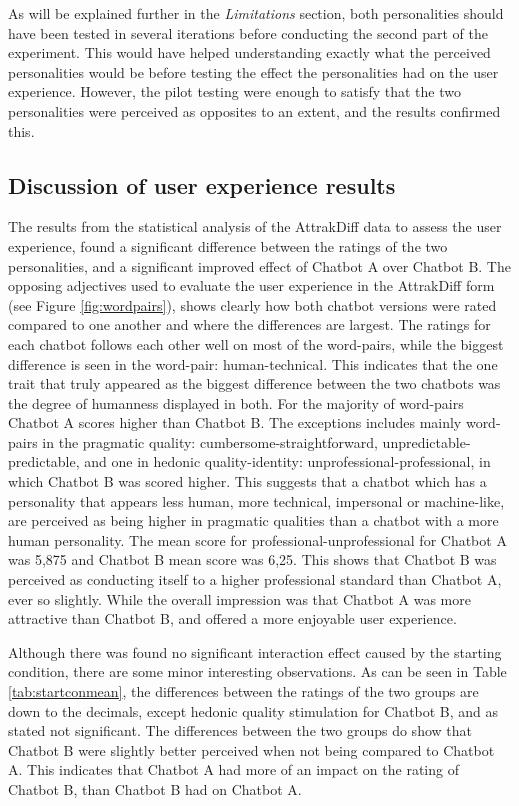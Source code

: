 As will be explained further in the \textit{Limitations} section, both personalities should have been tested in several iterations before conducting the second part of the experiment. This would have helped understanding exactly what the perceived personalities would be before testing the effect the personalities had on the user experience. However, the pilot testing were enough to satisfy that the two personalities were perceived as opposites to an extent, and the results confirmed this.

\subsection{Discussion of user experience results}

The results from the statistical analysis of the AttrakDiff data to assess the user experience, found a significant difference between the ratings of the two personalities, and a significant improved effect of Chatbot A over Chatbot B. The opposing adjectives used to evaluate the user experience in the AttrakDiff form (see Figure \ref{fig:wordpairs}), shows clearly how both chatbot versions were rated compared to one another and where the differences are largest. The ratings for each chatbot follows each other well on most of the word-pairs, while the biggest difference is seen in the word-pair: human-technical. This indicates that the one trait that truly appeared as the biggest difference between the two chatbots was the degree of humanness displayed in both. For the majority of word-pairs Chatbot A scores higher than Chatbot B. The exceptions includes mainly word-pairs in the pragmatic quality: cumbersome-straightforward, unpredictable-predictable, and one in hedonic quality-identity: unprofessional-professional, in which Chatbot B was scored higher. This suggests that a chatbot which has a personality that appears less human, more technical, impersonal or machine-like, are perceived as being higher in pragmatic qualities than a chatbot with a more human personality. The mean score for professional-unprofessional for Chatbot A was 5,875 and Chatbot B mean score was 6,25. This shows that Chatbot B was perceived as conducting itself to a higher professional standard than Chatbot A, ever so slightly. While the overall impression was that Chatbot A was more attractive than Chatbot B, and offered a more enjoyable user experience. 

Although there was found no significant interaction effect caused by the starting condition, there are some minor interesting observations. As can be seen in Table \ref{tab:startconmean}, the differences between the ratings of the two groups are down to the decimals, except hedonic quality stimulation for Chatbot B, and as stated not significant. The differences between the two groups do show that Chatbot B were slightly better perceived when not being compared to Chatbot A. This indicates that Chatbot A had more of an impact on the rating of Chatbot B, than Chatbot B had on Chatbot A.

